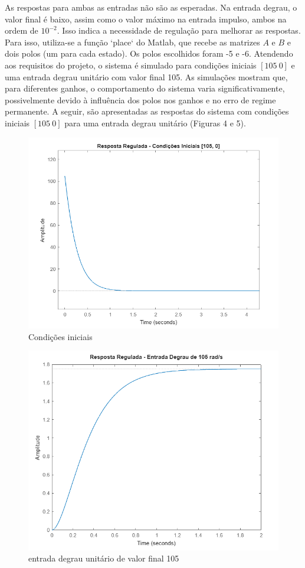 \documentclass[a4paper, 12pt]{article}
\begin{document}
\begin{itemize}
   As respostas para ambas as entradas não são as esperadas. Na entrada degrau, o valor final é baixo, assim como o valor máximo na entrada impulso, ambos na ordem de \( 10^{-2} \). Isso indica a necessidade de regulação para melhorar as respostas. Para isso, utiliza-se a função `place` do Matlab, que recebe as matrizes \( A \) e \( B \) e dois polos (um para cada estado). Os polos escolhidos foram -5 e -6.
   Atendendo aos requisitos do projeto, o sistema é simulado para condições iniciais \([105 \ 0]\) e uma entrada degrau unitário com valor final 105. As simulações mostram que, para diferentes ganhos, o comportamento do sistema varia significativamente, possivelmente devido à influência dos polos nos ganhos e no erro de regime permanente. A seguir, são apresentadas as respostas do sistema com condições iniciais \([105 \ 0]\) para uma entrada degrau unitário (Figuras 4 e 5).
   \begin{figure}[H]
       \centering
       \includegraphics[width=0.75\linewidth]{Step2.png}
       \caption{Condições iniciais}
       \label{fig:enter-label}
   \end{figure}
   
   \begin{figure}[H]
       \centering
       \includegraphics[width=0.75\linewidth]{stepcontrl.png}
       \caption{entrada degrau unitário de valor final 105}
       \label{fig:enter-label}
   \end{figure}


\end{itemize}
\end{document}
